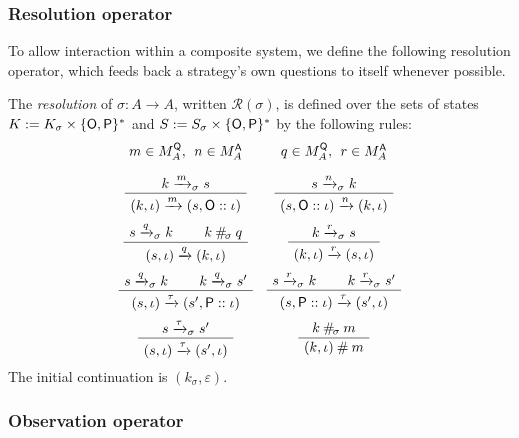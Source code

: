 \subsubsection{Resolution operator}

To allow interaction within a composite system,
we define the following resolution operator,
which feeds back a strategy's own questions to itself
whenever possible.

\begin{definition}
The \emph{resolution} of $\sigma : A \rightarrow A$,
written $\mathcal{R}(\sigma)$,
is defined over the sets of states
$K := K_\sigma \times \{ \mathsf{O} ,  \mathsf{P} \}^*$ and
$S := S_\sigma \times \{ \mathsf{O} ,  \mathsf{P} \}^*$
by the following rules:
\[
  \begin{array}{cc}
    {\small m \in M_A^\kw{Q}, \:\: n \in M_A^\kw{A}}
    &
    {\small q \in M_A^\kw{Q}, \:\: r \in M_A^\kw{A}}
    \\[1em]
    \AxiomC{$k \xrightarrow{m}_\sigma s$}
    \UnaryInfC{$(k, \iota) \xrightarrow{m} (s, \kw{O} :: \iota)$}
    \DisplayProof
    &
    \AxiomC{$s \xrightarrow{n}_\sigma k$}
    \UnaryInfC{$(s, \kw{O} :: \iota) \xrightarrow{n} (k, \iota)$}
    \DisplayProof
    \\[1.5em]
    \AxiomC{$s \xrightarrow{q}_\sigma k$}
    \AxiomC{$k \:\#_{\!\sigma}\: q$}
    \BinaryInfC{$(s, \iota) \xrightarrow{q} (k, \iota)$}
    \DisplayProof
    &
    \AxiomC{$k \xrightarrow{r}_\sigma s$}
    \UnaryInfC{$(k, \iota) \xrightarrow{r} (s, \iota)$}
    \DisplayProof
    \\[1.5em]
    \AxiomC{$s \xrightarrow{q}_\sigma k$}
    \AxiomC{$k \xrightarrow{q}_\sigma s'$}
    \BinaryInfC{$(s, \iota) \xrightarrow{\tau} (s', \kw{P} :: \iota)$}
    \DisplayProof
    &
    \AxiomC{$s \xrightarrow{r}_\sigma k$}
    \AxiomC{$k \xrightarrow{r}_\sigma s'$}
    \BinaryInfC{$(s, \kw{P} :: \iota) \xrightarrow{\tau} (s', \iota)$}
    \DisplayProof
    \\[1.5em]
    \AxiomC{$s \xrightarrow{\tau}_\sigma s'$}
    \UnaryInfC{$(s, \iota) \xrightarrow{\tau} (s', \iota)$}
    \DisplayProof
    &
    \AxiomC{$k \:\#_{\!\sigma}\: m$}
    \UnaryInfC{$(k, \iota) \:\#\: m$}
    \DisplayProof
  \end{array}
\]
The initial continuation is $(k_{\sigma}, \varepsilon)$.
\end{definition}

\subsubsection{Observation operator}


